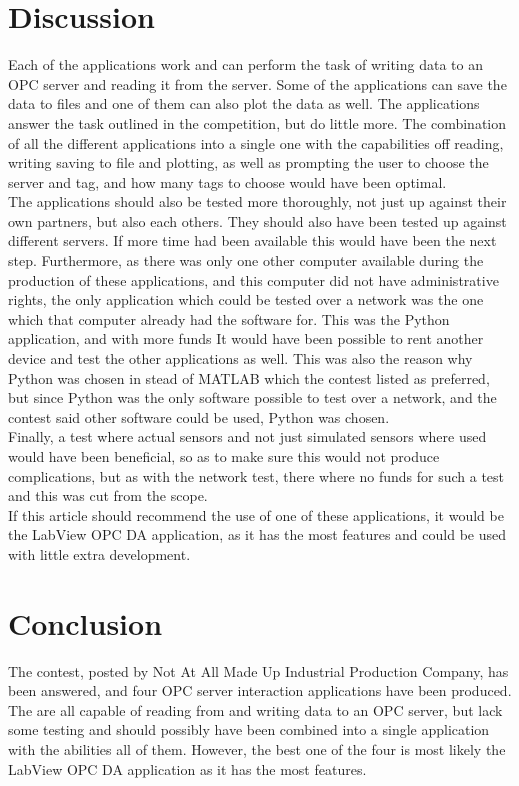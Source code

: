 \documentclass[11pt, A4paper, english]{article}
\begin{document}
	\section{Discussion}
Each of the applications work and can perform the task of writing data to an OPC server and reading it from the server. Some of the applications can save the data to files and one of them can also plot the data as well. The applications answer the task outlined in the competition, but do little more. The combination of all the different applications into a single one with the capabilities off reading, writing saving to file and plotting, as well as prompting the user to choose the server and tag, and how many tags to choose would have been optimal. \\
The applications should also be tested more thoroughly, not just up against their own partners, but also each others. They should also have been tested up against different servers. If more time had been available this would have been the next step. Furthermore, as there was only one other computer available during the production of these applications, and this computer did not have administrative rights, the only application which could be tested over a network was the one which that computer already had the software for. This was the Python application, and with more funds It would have been possible to rent another device and test the other applications as well. This was also the reason why Python was chosen in stead of MATLAB which the contest listed as preferred, but since Python was the only software possible to test over a network, and the contest said other software could be used, Python was chosen. \\
Finally, a test where actual sensors and not just simulated sensors where used would have been beneficial, so as to make sure this would not produce complications, but as with the network test, there where no funds for such a test and this was cut from the scope. \\
If this article should recommend the use of one of these applications, it would be the LabView OPC DA application, as it has the most features and could be used with little extra development.

	\section{Conclusion}
The contest, posted by Not At All Made Up Industrial Production Company, has been answered, and four OPC server interaction applications have been produced. The are all capable of reading from and writing data to an OPC server, but lack some testing and should possibly have been combined into a single application with the abilities all of them. However, the best one of the four is most likely the LabView OPC DA application as it has the most features.
\end{document}

